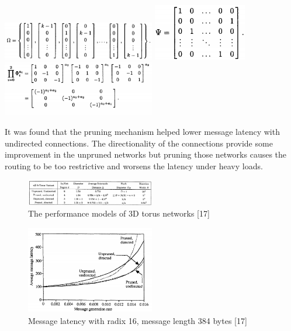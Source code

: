 \documentclass[letterpaper, 10 pt, conference]{ieeeconf}
\begin{document}
\includegraphics [width=0.5\textwidth] {Omega.PNG} \includegraphics {Psi.PNG} \includegraphics[width=0.5\textwidth] {Phi.PNG}

It was found that the pruning mechanism helped lower message latency with undirected connections.  The directionality of the connections provide some improvement in the unpruned networks but pruning those networks causes the routing to be too restrictive and worsens the latency under heavy loads.

\begin{figure}[!ht] %
	\centering
	\includegraphics [width=0.5\textwidth] {Torus_Prune_Table2.PNG} 
    \caption{The performance models of 3D torus networks [17]}
\end{figure}

\begin{figure}[!ht] %
	\centering
	\includegraphics [width=0.5\textwidth] {Prune_Data.PNG} 
    \caption{Message latency with radix 16, message length 384 bytes [17]}
\end{figure}
\end{document}

